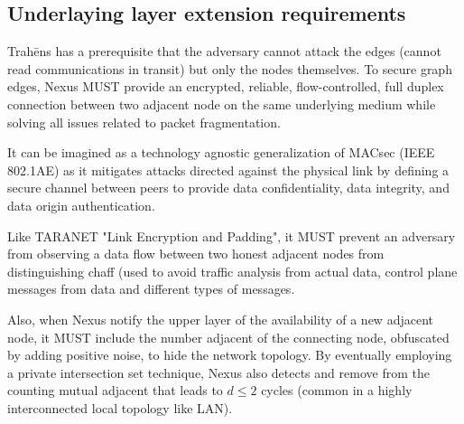 \documentclass[12pt,oneside]{wlscirep}
\newcommand{\ProtoName}{Trah\={e}ns }
\begin{document}
\subsection{Underlaying layer extension requirements}
\ProtoName has a prerequisite that the adversary cannot attack the edges (cannot read communications in transit) but only the nodes themselves. To secure graph edges, Nexus MUST provide an encrypted, reliable, flow-controlled, full duplex connection between two adjacent node on the same underlying medium while solving all issues related to packet fragmentation. \par 
It can be imagined as a technology agnostic generalization of MACsec\cite{noauthor_802.1ae:2018} (IEEE 802.1AE) as it mitigates attacks directed against the physical link by defining a secure channel between peers to provide data confidentiality, data integrity, and data origin authentication.\par
Like TARANET\cite{chen_taranet:_2018} "Link Encryption and Padding", it MUST prevent an adversary from observing a data flow between two honest adjacent nodes from distinguishing chaff (used to avoid traffic analysis from actual data, control plane messages from data and different types of messages.\par
Also, when Nexus notify the upper layer of the availability of a new adjacent node, it MUST include the number adjacent of the connecting node, obfuscated by adding positive noise, to hide the network topology. By eventually employing a private intersection set technique, Nexus also detects and remove from the counting mutual adjacent that leads to $d\leq 2$ cycles (common in a highly interconnected local topology like LAN).\par
\end{document}
